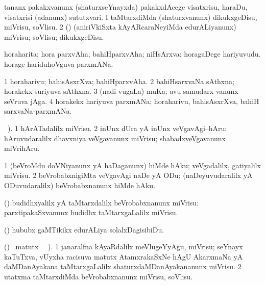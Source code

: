 \bentry
{}
\gl{\sakirx}
\bmng
\bnum
{} 
\banum
{} tananx pakakxvanunx (shaturxseYnayxda) pakakxdAcege visatxrisu, haraDu, visatxrisi (adanunx) sututxvari. 
 I taMtarxdiMda (shaturxvanunx) dikukxgeDisu, miVrisu, soVlisu. 
\eanum
\numie
\num{2} (\rUpa) (aniriVkiSxta kAyARcaraNeyiMda edurALiyanunx) miVrisu; soVlisu; dikukxgeDisu. 
\enum
\emng
\eentry

\bentry
{}
\gl{\nA}
\bmng
horaharita; hora parxvAha; bahiHparxvAha; niHsArxva: 
\banum
{} horagaDege hariyuvudu. 
 horage hariduhoVguva parxmANa. 
\eanum
\emng
\eentry

\bentry
{}
\gl{\nA}
\bmng
\bnum
\num{1} horaharivu; bahisAsxrXva; bahiHparxvAha. 
\num{2} bahiHsarxvaNa sAthxna; horakekx suriyuva sAthxna. 
\num{3} (nadi \mo vugaLa) muKa; avu samudarx \mo vanunx seVruva jAga. 
\num{4} horakekx hariyuva parxmANa; horaharivu, bahisAsxrXva, bahiH sarxvaNa-parxmANa. 
\enum
\emng
\eentry

\bentry
{}
\gl{\sakirx}
 \BUkaq\ ).\bmng
\bnum
\num{1} hArATadalilx miVrisu. 
\num{2} inUnx dUra yA inUnx veVgavAgi--hAru:  hAruvudaralilx dhavxniya veVgavanunx miVrisu; shabadxveVgavanunx miVrihAru. 
\enum
\emng
\eentry

\bentry
{}
\gl{\sakirx}
\bmng
\bnum
\num{1} (beVroMdu doVNiyanunx yA haDaganunx) hiMde hAku; veVgadalilx, gatiyalilx miVrisu. 
\num{2} beVrobabxnigiMta veVgavAgi naDe yA ODu; (naDeyuvudaralilx yA ODuvudaralilx) beVrobabxnanunx hiMde hAku. 
\enum
\emng
\eentry

\bentry
{}
\gl{\sakirx}
\bmng
(\AmA) budidhxyalilx yA taMtarxdalilx beVrobabxnanunx miVrisu:  parxtipakaSxvanunx budidhx taMtarxgaLalilx miVrisu. 
\emng
\eentry

\bentry
{}
\gl{\sakirx}
\bmng
(\pArxparx) hububx gaMTikikx edurALiya solalxDagisibiDu. 
\emng
\eentry

\bentry
{}
\gl{\sakirx}
 (\ame) \BU\ matutx \BUkaq\ \vakaq\ ).\bmng
\bnum
\num{1} janaralfna kAyaRdalilx meVlugeYyAgu, miVrisu; seYnayx kaTuTxva, vUyxha racisuva matutx AtamxrakaSxNe hAgU AkarxmaNa yA daMDanAyakana taMtarxgaLalilx shaturxdaMDanAyakananunx miVrisu. 
\num{2} utatxma taMtarxdiMda beVrobabxnanunx miVrisu, soVlisu. 
\enum
\emng
\eentry


